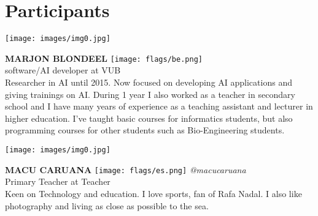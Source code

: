 \section*{Participants}
\noindent
\begin{minipage}{0.3\textwidth}
\centering
\texttt{[image: images/img0.jpg]}
\end{minipage}
\hfill
\begin{minipage}{0.6\textwidth}\raggedright
\color{color1}\uppercase{\textbf{Marjon Blondeel}}
\color{color2}\hspace{0.2cm}\texttt{[image: flags/be.png]}
\\
software/AI developer at VUB\\
{\footnotesize Researcher in AI until 2015. Now focused on developing AI applications and giving trainings on AI. During 1 year I also worked as a teacher in secondary school and I have many years of experience as a teaching assistant and lecturer in higher education. I've taught basic courses for informatics students, but also programming courses for other students such as Bio-Engineering students. }\\
\end{minipage}
\newline\newline\newline

\noindent
\begin{minipage}{0.3\textwidth}
\centering
\texttt{[image: images/img0.jpg]}
\end{minipage}
\hfill
\begin{minipage}{0.6\textwidth}\raggedright
\color{color1}\uppercase{\textbf{Macu Caruana}}
\color{color2}\hspace{0.2cm}\texttt{[image: flags/es.png]}
\hspace{0.2cm}\textit{@macucaruana}
\\
Primary Teacher at Teacher\\
{\footnotesize Keen on Technology and education. I love sports, fan of Rafa Nadal. I also like photography and living as close as possible to the sea.}\\
\end{minipage}
\newline\newline\newline

